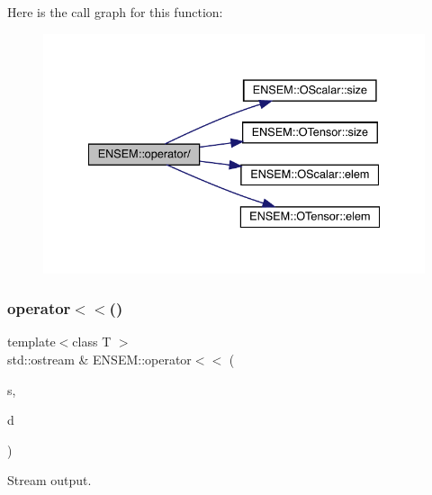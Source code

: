 Here is the call graph for this function\+:\nopagebreak
\begin{figure}[H]
\begin{center}
\leavevmode
\includegraphics[width=335pt]{de/d87/group__obstensor_ga7a165136688ba38f4500951758f372d3_cgraph}
\end{center}
\end{figure}
\mbox{\label{group__obstensor_gad4f1a718046854030a9c11c1a6d21712}} 
\subsubsection{\texorpdfstring{operator$<$$<$()}{operator<<()}\hspace{0.1cm}{\footnotesize\ttfamily [1/3]}}
{\footnotesize\ttfamily template$<$class T $>$ \\
std\+::ostream \& E\+N\+S\+E\+M\+::operator$<$$<$ (\begin{DoxyParamCaption}\item[{std\+::ostream \&}]{s,  }\item[{const \mbox{\hyperlink{classENSEM_1_1OTensor}{O\+Tensor}}$<$ T $>$ \&}]{d }\end{DoxyParamCaption})\hspace{0.3cm}{\ttfamily [inline]}}



Stream output. 

